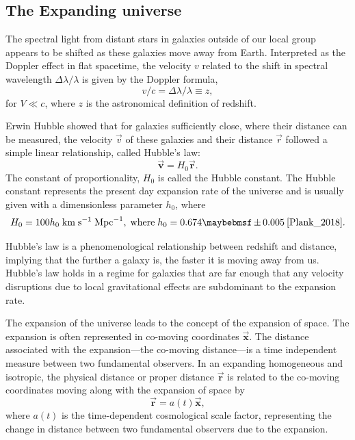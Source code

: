 \subsection{The Expanding universe}

The spectral light from distant stars in galaxies outside of our local group appears to be shifted as these galaxies move away from Earth. Interpreted as the Doppler effect in flat spacetime, the velocity $v$ related to the shift in spectral wavelength $\Delta \lambda/\lambda$ is given by the Doppler formula,
%
\begin{equation}
  v/c = \Delta \lambda/\lambda \equiv z,
\end{equation}
%
for $V \ll c$, where $z$ is the astronomical definition of redshift. 

Erwin Hubble showed that for galaxies sufficiently close, where their distance can be measured, the velocity $\vec{v}$ of these galaxies and their distance $\vec{r}$ followed a simple linear relationship, called Hubble's law:
%
\begin{equation}
  \boldsymbol{\vec{v}} = H_0\boldsymbol{\vec{r}}.
\end{equation}
%
The constant of proportionality, $H_0$ is called the Hubble constant. The Hubble constant represents the present day expansion rate of the universe and is usually given with a dimensionless parameter $h_0$, where
%
\begin{equation}\label{eq:hubble_constant}
  H_0 = 100h_0 \; \MathText{km} \; \MathText{s}^{-1} \; \MathText{Mpc}^{-1}, \; \MathText{where} \; h_0 = 0.674 \pm 0.005 \: \cite{Plank_2018}.
\end{equation}
%

Hubble's law is a phenomenological relationship between redshift and distance, implying that the further a galaxy is, the faster it is moving away from us. Hubble's law holds in a regime for galaxies that are far enough that any velocity disruptions due to local gravitational effects are subdominant to the expansion rate.

The expansion of the universe leads to the concept of the expansion of space. The expansion is often represented in co-moving coordinates $\boldsymbol{\vec{x}}$. The distance associated with the expansion---the co-moving distance---is a time independent measure between two fundamental observers. In an expanding homogeneous and isotropic, the physical distance or proper distance $\boldsymbol{\vec{r}}$ is related to the co-moving coordinates moving along with the expansion of space by
%
\begin{equation}
  \boldsymbol{\vec{r}} = a(t)\boldsymbol{\vec{x}},
\end{equation}
%
where $a(t)$ is the time-dependent cosmological scale factor, representing the change in distance between two fundamental observers due to the expansion.

